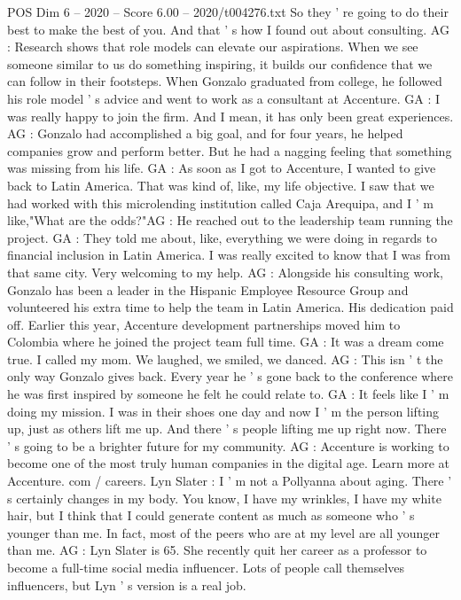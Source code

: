 \begin{textsample}{POS Dim 6 – 2020 – Score 6.00 – 2020/t004276.txt}
So they ' re going to do their best to make the best of you.
And that ' s how I found out about consulting.
AG : Research shows that role models can elevate our aspirations.
When we see someone similar to us do something inspiring, it builds our confidence that we can follow in their footsteps.
When Gonzalo graduated from college, he followed his role model ' s advice and went to work as a consultant at Accenture.
GA : I was really happy to join the firm.
And I mean, it has only been great experiences.
AG : Gonzalo had accomplished a big goal, and for four years, he helped companies grow and perform better.
But he had a nagging feeling that something was missing from his life.
GA : As soon as I got to Accenture, I wanted to give back to Latin America.
That was kind of, like, my life objective.
I saw that we had worked with this microlending institution called Caja Arequipa, and I ' m like,"What are the odds?"AG : He reached out to the leadership team running the project.
GA : They told me about, like, everything we were doing in regards to financial inclusion in Latin America.
I was really excited to know that I was from that same city.
Very welcoming to my help.
AG : Alongside his consulting work, Gonzalo has been a leader in the Hispanic Employee Resource Group and volunteered his extra time to help the team in Latin America.
His dedication paid off.
Earlier this year, Accenture development partnerships moved him to Colombia where he joined the project team full time.
GA : It was a dream come true.
I called my mom.
We laughed, we smiled, we danced.
AG : This isn ' t the only way Gonzalo gives back.
Every year he ' s gone back to the conference where he was first inspired by someone he felt he could relate to.
GA : It feels like I ' m doing my mission.
I was in their shoes one day and now I ' m the person lifting up, just as others lift me up.
And there ' s people lifting me up right now.
There ' s going to be a brighter future for my community.
AG : Accenture is working to become one of the most truly human companies in the digital age.
Learn more at Accenture. com / careers.
Lyn Slater : I ' m not a Pollyanna about aging.
There ' s certainly changes in my body.
You know, I have my wrinkles, I have my white hair, but I think that I could generate content as much as someone who ' s younger than me.
In fact, most of the peers who are at my level are all younger than me.
AG : Lyn Slater is 65.
She recently quit her career as a professor to become a full-time social media influencer.
Lots of people call themselves influencers, but Lyn ' s version is a real job.

\end{textsample}
